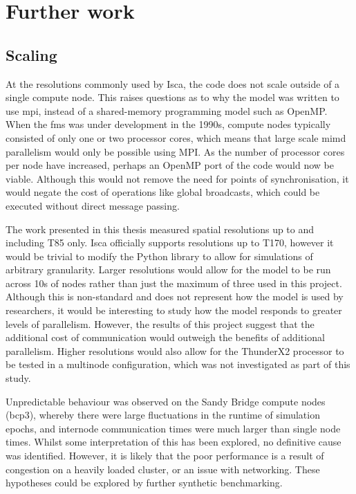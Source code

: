 \documentclass[a4paper,11pt]{report}
\begin{document}
\par

\section{Further work}
\subsection{Scaling}
At the resolutions commonly used by Isca, the code does not scale outside of a single compute node. This raises questions as to why the model was written to use \gls{mpi}, instead of a shared-memory programming model such as OpenMP. When the \gls{fms} was under development in the 1990s, compute nodes typically consisted of only one or two processor cores, which means that large scale \gls{mimd} parallelism would only be possible using MPI. As the number of processor cores per node have increased, perhaps an OpenMP port of the code would now be viable. Although this would not remove the need for points of synchronisation, it would negate the cost of operations like global broadcasts, which could be executed without direct message passing. 
\par
The work presented in this thesis measured spatial resolutions up to and including T85 only. Isca officially supports resolutions up to T170, however it would be trivial to modify the Python library to allow for simulations of arbitrary granularity. Larger resolutions would allow for the model to be run across 10s of nodes rather than just the maximum of three used in this project. Although this is non-standard and does not represent how the model is used by researchers, it would be interesting to study how the model responds to greater levels of parallelism. However, the results of this project suggest that the additional cost of communication would outweigh the benefits of additional parallelism. Higher resolutions would also allow for the ThunderX2 processor to be tested in a multinode configuration, which was not investigated as part of this study. 
\par
Unpredictable behaviour was observed on the Sandy Bridge compute nodes (\gls{bcp3}), whereby there were large fluctuations in the runtime of simulation epochs, and internode communication times were much larger than single node times. Whilst some interpretation of this has been explored, no definitive cause was identified. However, it is likely that the poor performance is a result of congestion on a heavily loaded cluster, or an issue with networking. These hypotheses could be explored by further synthetic benchmarking.
\end{document}
